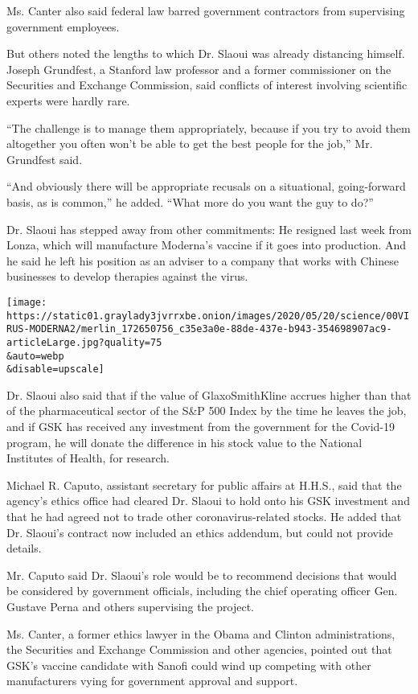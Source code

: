 Ms. Canter also said federal law barred government contractors from
supervising government employees.

But others noted the lengths to which Dr. Slaoui was already distancing
himself. Joseph Grundfest, a Stanford law professor and a former
commissioner on the Securities and Exchange Commission, said conflicts
of interest involving scientific experts were hardly rare.

``The challenge is to manage them appropriately, because if you try to
avoid them altogether you often won't be able to get the best people for
the job,'' Mr. Grundfest said.

``And obviously there will be appropriate recusals on a situational,
going-forward basis, as is common,'' he added. ``What more do you want
the guy to do?''

Dr. Slaoui has stepped away from other commitments: He resigned last
week from Lonza, which will manufacture Moderna's vaccine if it goes
into production. And he said he left his position as an adviser to a
company that works with Chinese businesses to develop therapies against
the virus.

\texttt{[image: https://static01.graylady3jvrrxbe.onion/images/2020/05/20/science/00VIRUS-MODERNA2/merlin\_172650756\_c35e3a0e-88de-437e-b943-354698907ac9-articleLarge.jpg?quality=75\\\&auto=webp\\\&disable=upscale]}

Dr. Slaoui also said that if the value of GlaxoSmithKline accrues higher
than that of the pharmaceutical sector of the S\&P 500 Index by the time
he leaves the job, and if GSK has received any investment from the
government for the Covid-19 program, he will donate the difference in
his stock value to the National Institutes of Health, for research.

Michael R. Caputo, assistant secretary for public affairs at H.H.S.,
said that the agency's ethics office had cleared Dr. Slaoui to hold onto
his GSK investment and that he had agreed not to trade other
coronavirus-related stocks. He added that Dr. Slaoui's contract now
included an ethics addendum, but could not provide details.

Mr. Caputo said Dr. Slaoui's role would be to recommend decisions that
would be considered by government officials, including the chief
operating officer Gen. Gustave Perna and others supervising the project.

Ms. Canter, a former ethics lawyer in the Obama and Clinton
administrations, the Securities and Exchange Commission and other
agencies, pointed out that GSK's vaccine candidate with Sanofi could
wind up competing with other manufacturers vying for government approval
and support.

